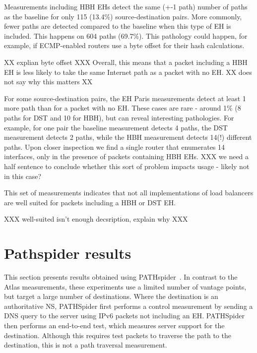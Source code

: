 \documentclass[conference]{IEEEtran}
\begin{document}
Measurements including HBH EHs detect the same (+-1 path) number of paths as the baseline for only 115 (13.4\%) source-destination pairs. More commonly, fewer paths are detected compared to the baseline when this type of EH is included. This happens on 604 paths (69.7\%). This pathology could happen, for example, if ECMP-enabled routers use a byte offset for their hash calculations. 

XX explian byte offset XXX
Overall, this means that a packet including a HBH EH is less likely to take the same Internet path as a  packet with no EH.
XX does not say why this matters XX

For some source-destination pairs, the EH Paris measurements detect at least 1 more path than for a packet with no EH.  These cases are rare - around 1\% (8 paths for DST and 10 for HBH), but can reveal interesting pathologies.
For example, for one pair the baseline measurement detects 4 paths, the DST measurement detects 2 paths, while the HBH measurement detects 14(!) different paths. Upon closer inspection we find a single router that enumerates 14 interfaces, only in the presence of packets containing HBH EHs.
XXX we need a half sentence to conclude whether this sort of problem impacts usage - likely not in this case?

This set of measurements indicates that not all implementations of load balancers  are well suited for packets including a HBH or DST EH.

 XXX well-suited isn't enough decsription, explain why XXX
 
\section{Pathspider results} 
\label{sec:pathspider-results}

This section presents results obtained using PATHspider~\cite{learmonth2016pathspider}. In contrast to the Atlas measurements, these experiments use a limited number of vantage points, but target a large number of destinations. Where the destination is an authoritative NS, PATHSpider first performs a control measurement by sending a DNS query to the server using IPv6 packets not including an EH.
PATHSpider then performs an end-to-end test, which measures server support for the destination. Although this requires test packets to traverse the path to the destination, this is not a path traversal measurement.
\end{document}
